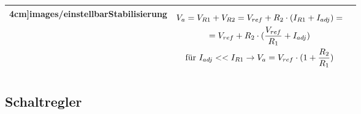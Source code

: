 \begin{longtable}{|l|l|l|}
\begin{minipage}{6cm}
4cm]{images/einstellbarStabilisierung}
\end{minipage}
&
\begin{minipage}{8cm}
\begin{gather*}
V_{a}=V_{R1}+V_{R2}=V_{ref}+R_{2} \cdot (I_{R1}+I_{adj})=\notag\\=V_{ref}+R_{2} \cdot (\frac{V_{ref}}{R_{1}}+I_{adj})\\
\text{für }I_{adj}<< I_{R1} \to V_{a}=V_{ref} \cdot (1+\frac{R_{2}}{R_{1}})
\end{gather*}
\end{minipage}
\\
\hline
\end{longtable}


\subsection{Schaltregler} 
